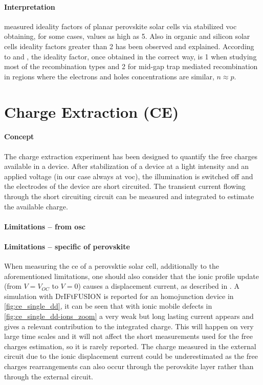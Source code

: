 		\paragraph{Interpretation} %
		 measured ideality factors of planar perovskite solar cells via stabilized \gls{voc} obtaining, for some cases, values as high as 5. Also in organic \cite{Kirchartz2011,Kirchartz2012} and silicon solar cells \cite{Breitenstein2006} ideality factors greater than 2 has been observed and explained. According to  and , the ideality factor, once obtained in the correct way, is 1 when studying most of the recombination types and 2 for mid-gap trap mediated recombination in regions where the electrons and holes concentrations are similar, $n \approx p$.

\section{Charge Extraction (CE)}

	\paragraph{Concept} The charge extraction experiment has been designed\cite{Duffy2000} to quantify the free charges available in a device. After stabilization of a device at a light intensity and an applied voltage (in our case always at \gls{voc}), the illumination is switched off and the electrodes of the device are short circuited. The transient current flowing through the short circuiting circuit can be measured and integrated to estimate the available charge.
	
	\paragraph{Limitations -- from \gls{osc}}
	
	\paragraph{Limitations -- specific of perovskite} When measuring the \gls{ce} of a perovsktie solar cell, additionally to the aforementioned limitations, one should also consider that the ionic profile update (from $V=V_{OC}$ to $V=0$) causes a displacement current, as described in . A simulation with DrIFtFUSION is reported for an homojunction device in \cref{fig:ce_single_dd}, it can be seen that with ionic mobile defects in \cref{fig:ce_single_dd-ions_zoom} a very weak but long lasting current appears and gives a relevant contribution to the integrated charge. This will happen on very large time scales and it will not affect the short measurements used for the free charges estimation, so it is rarely reported\cite{ORegan2015b}. The charge measured in the external circuit due to the ionic displacement current could be underestimated as the free charges rearrangements can also occur through the perovskite layer rather than through the external circuit.
	
